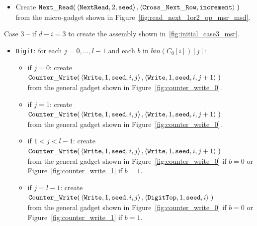 \begin{itemize}
    \item Create
    $\begin{aligned}[t]
        {\tt Next\_Read}(& \left\langle {\tt NextRead}, 2,      {\tt seed}      \right\rangle,
                    \left\langle {\tt Cross\_Next\_Row}, {\tt increment} \right\rangle \;)
    \end{aligned}$\\from the micro-gadget shown in Figure~\ref{fig:read_next_1or2_op_msr_msd}.
\end{itemize}



Case 3 -- if $d - i = 3$ to create the assembly shown in~\ref{fig:initial_case3_msr}.
\begin{itemize}

    \item {\tt Digit}: for each $j=0,\ldots,l-1$ and each $b$ in $bin(C_0[i])[j]$:
    \begin{itemize}
        \item if $j = 0$: create
        $\begin{aligned}[t]
            {\tt Counter\_Write}(&\left\langle {\tt Write}, 1, {\tt seed}, i, j \right\rangle, \left\langle {\tt Write}, 1, {\tt seed}, i, j + 1 \right\rangle \;)
        \end{aligned}$\\from the general gadget shown in Figure~\ref{fig:counter_write_0}.

        \item if $j = 1$: create
        $\begin{aligned}[t]
            {\tt Counter\_Write}(&\left\langle {\tt Write}, 1, {\tt seed}, i, j \right\rangle, \left\langle {\tt Write}, 1, {\tt seed}, i, j + 1 \right\rangle \;)
        \end{aligned}$\\from the general gadget shown in Figure~\ref{fig:counter_write_0}.

        \item if $1 < j < l-1$: create
        $\begin{aligned}[t]
            {\tt Counter\_Write}(&\left\langle {\tt Write}, 1, {\tt seed}, i, j \right\rangle, \left\langle {\tt Write}, 1, {\tt seed}, i, j + 1 \right\rangle \;)
        \end{aligned}$\\from the general gadget shown in Figure~\ref{fig:counter_write_0} if $b = 0$ or Figure~\ref{fig:counter_write_1} if $b = 1$.

        \item if $j = l-1$: create
        $\begin{aligned}[t]
            {\tt Counter\_Write}(&\left\langle {\tt Write}, 1, {\tt seed}, i, j \right\rangle, \left\langle {\tt DigitTop}, 1, {\tt seed}, i \right\rangle \;)
        \end{aligned}$\\from the general gadget shown in Figure~\ref{fig:counter_write_0} if $b = 0$ or Figure~\ref{fig:counter_write_1} if $b = 1$.
    \end{itemize}



\end{itemize}

